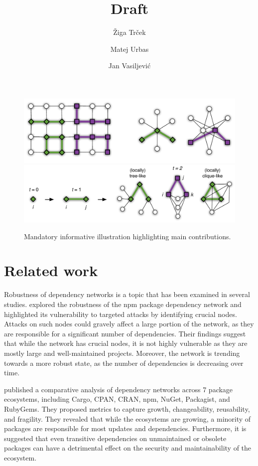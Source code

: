 \documentclass[9pt,twocolumn,twoside]{pnas-report}
\title{Draft}
\author[a]{Žiga Trček}
\author[a]{Matej Urbas}
\author[a]{Jan Vasiljević}
\affil[a]{University of Ljubljana, Faculty of Computer and Information Science, Ve\v{c}na pot 113, SI-1000 Ljubljana, Slovenia}
\begin{document}
\maketitle
\thispagestyle{firststyle}

\lipsum[1-4]

\begin{figure}[t]\centering%
	\includegraphics[width=0.9\linewidth]{examples}
	\includegraphics[width=\linewidth]{growth}
	\caption{Mandatory informative illustration highlighting main contributions.~\cite{Sub18a}}
	\label{fig:example}
\end{figure}

\section*{Related work}

Robustness of dependency networks is a topic that has been examined in several studies.
\cite{hafner2021robustness} explored the robustness of the npm package dependency network and highlighted its vulnerability to targeted attacks by identifying crucial nodes.
Attacks on such nodes could gravely affect a large portion of the network, as they are responsible for a significant number of dependencies.
Their findings suggest that while the network has crucial nodes, it is not highly vulnerable as they are mostly large and well-maintained projects.
Moreover, the network is trending towards a more robust state, as the number of dependencies is decreasing over time.

\cite{decan2018evolution} published a comparative analysis of dependency networks across 7 package ecosystems, including Cargo, CPAN, CRAN, npm, NuGet, Packagist, and RubyGems.
They proposed metrics to capture growth, changeability, reusability, and fragility.
They revealed that while the ecosystems are growing, a minority of packages are responsible for most updates and dependencies.
Furthermore, it is suggested that even transitive dependencies on unmaintained or obsolete packages can have a detrimental effect on the security and maintainability of the ecosystem.
\end{document}
